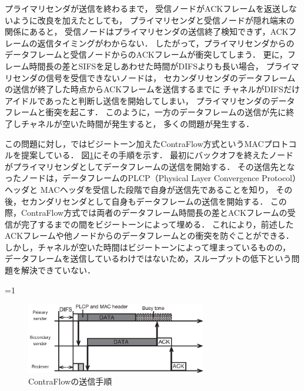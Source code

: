 \documentclass[master]{kuisthesis}		%
\newcounter{flagFig}
\begin{document}
			プライマリセンダが送信を終わるまで，
			受信ノードがACKフレームを返送しないように改良を加えたとしても，
			プライマリセンダと受信ノードが隠れ端末の関係にあると，
			受信ノードはプライマリセンダの送信終了検知できず，ACKフレームの返信タイミングがわからない．
			したがって，プライマリセンダからのデータフレームと受信ノードからのACKフレームが衝突してしまう．
			更に，フレーム時間長の差とSIFSを足しあわせた時間がDIFSよりも長い場合，
			プライマリセンダの信号を受信できないノードは，
			セカンダリセンダのデータフレームの送信が終了した時点からACKフレームを送信するまでに
			チャネルがDIFSだけアイドルであったと判断し送信を開始してしまい，
			プライマリセンダのデータフレームと衝突を起こす．
			このように，一方のデータフレームの送信が先に終了しチャネルが空いた時間が発生すると，
			多くの問題が発生する．

			\par
			この問題に対し，\cite{contra}ではビジートーン加えたContraFlow方式というMACプロトコルを提案している．
			図\ref{fig:contra_process}にその手順を示す．
			最初にバックオフを終えたノードがプライマリセンダとしてデータフレームの送信を開始する．
			その送信先となったノードは，データフレームのPLCP（Physical Layer Convergence Protocol）ヘッダと
			MACヘッダを受信した段階で自身が送信先であることを知り，
			その後，セカンダリセンダとして自身もデータフレームの送信を開始する．
			この際，ContraFlow方式では両者のデータフレーム時間長の差とACKフレームの受信が完了するまでの間をビジートーンによって埋める．
			これにより，前述したACKフレームや他ノードからのデータフレームとの衝突を防ぐことができる．
			しかし，チャネルが空いた時間はビジートーンによって埋まっているものの，
			データフレームを送信しているわけではないため，スループットの低下という問題を解決できていない．

			\ifnum\value{flagFig}=1 {\begin{figure}[htbp]
				\begin{center}
					\includegraphics[width=0.7\textwidth]{fig/contra_process.eps}
					\caption{ContraFlowの送信手順}
					\label{fig:contra_process}
				\end{center}
			\end{figure}}\fi
\end{document}
